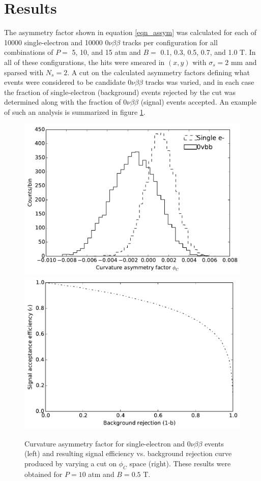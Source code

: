 \documentclass{JINST}
\begin{document}
\section{Results}
The asymmetry factor shown in equation \ref{eqn_assym} was calculated for each of 10000 single-electron and 10000 $0\nu\beta\beta$ tracks per configuration for all combinations of $P =$ 5, 10, and 15 atm and $B =$ 0.1, 0.3, 0.5, 0.7, and 1.0 T.  In all of these configurations, the hits were smeared in $(x,y)$ with $\sigma_{s} = 2$ mm and sparsed with $N_{s} = 2$.  A cut on the calculated asymmetry factors defining what events were considered to be candidate $0\nu\beta\beta$ tracks was varied, and in each case the fraction of single-electron (background) events rejected by the cut was determined along with the fraction of $0\nu\beta\beta$ (signal) events accepted.  An example of such an analysis is summarized in figure \ref{fig_svsbg}.

\begin{figure}[!htb]
	\includegraphics[scale=0.44]{fig/10atm_05T_scurv_diff_means.pdf}
	\includegraphics[scale=0.44]{fig/10atm_05T_sigvsb_all.pdf}
	\caption{\label{fig_svsbg}Curvature asymmetry factor for single-electron and $0\nu\beta\beta$ events (left) and resulting signal efficiency vs. background rejection curve produced by varying a cut on $\phi_{C}$ space (right).  These results were obtained for $P = 10$ atm and $B = 0.5$ T.}
\end{figure}
\end{document}
